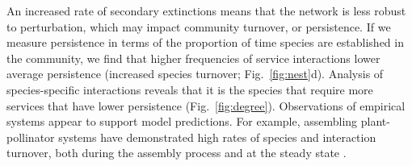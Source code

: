 \documentclass[twocolumn,preprintnumbers,amsmath,amssymb,superscriptaddress,linenumbers]{revtex4-1}
\begin{document}
An increased rate of secondary extinctions means that the network is less robust to perturbation, which may impact community turnover, or persistence.
If we measure persistence in terms of the proportion of time species are established in the community, we find that higher frequencies of service interactions lower average persistence (increased species turnover; Fig.\ \ref{fig:nest}d).
Analysis of species-specific interactions reveals that it is the species that require more services that have lower persistence (Fig.\ \ref{fig:degree}).
Observations of empirical systems appear to support model predictions.
For example, assembling plant-pollinator systems have demonstrated high rates of species and interaction turnover, both during the assembly process and at the steady state \cite{DiazCastelazo2013}. %
\end{document}
